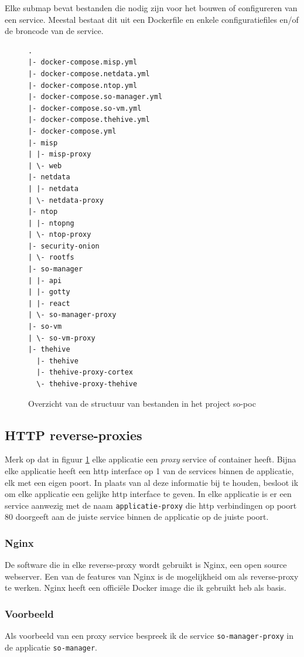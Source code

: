 \documentclass[a4paper,12pt]{report}
\begin{document}
Elke submap bevat bestanden die nodig zijn voor het bouwen of configureren van een service.
Meestal bestaat dit uit een Dockerfile en enkele configuratiefiles en/of de broncode van de service.

\begin{figure}[H]
  \begin{lstlisting}
.
|- docker-compose.misp.yml
|- docker-compose.netdata.yml
|- docker-compose.ntop.yml
|- docker-compose.so-manager.yml
|- docker-compose.so-vm.yml
|- docker-compose.thehive.yml
|- docker-compose.yml
|- misp
| |- misp-proxy
| \- web
|- netdata
| |- netdata
| \- netdata-proxy
|- ntop
| |- ntopng
| \- ntop-proxy
|- security-onion
| \- rootfs
|- so-manager
| |- api
| |- gotty
| |- react
| \- so-manager-proxy
|- so-vm
| \- so-vm-proxy
|- thehive
  |- thehive
  |- thehive-proxy-cortex
  \- thehive-proxy-thehive
  \end{lstlisting}
  \caption{Overzicht van de structuur van bestanden in het project so-poc}
  \label{fig:so-poc-structuur-docker-compose-containers}
\end{figure}

\subsection{HTTP reverse-proxies}
Merk op dat in figuur \ref{fig:so-poc-structuur-docker-compose-containers} elke applicatie een \emph{proxy} service of container heeft.
Bijna elke applicatie heeft een http interface op 1 van de services binnen de applicatie, elk met een eigen poort.
In plaats van al deze informatie bij te houden, besloot ik om elke applicatie een gelijke http interface te geven.
In elke applicatie is er een service aanwezig met de naam \lstinline|applicatie-proxy| die http verbindingen op poort 80 doorgeeft aan de juiste service binnen de applicatie op de juiste poort.

\subsubsection{Nginx}
De software die in elke reverse-proxy wordt gebruikt is Nginx, een open source webserver.
Een van de features van Nginx is de mogelijkheid om als reverse-proxy te werken.
Nginx heeft een officiële Docker image die ik gebruikt heb als basis.
\autocite{nginx:about}

\subsubsection{Voorbeeld}
Als voorbeeld van een proxy service bespreek ik de service \lstinline|so-manager-proxy| in de applicatie \lstinline|so-manager|.
\end{document}
